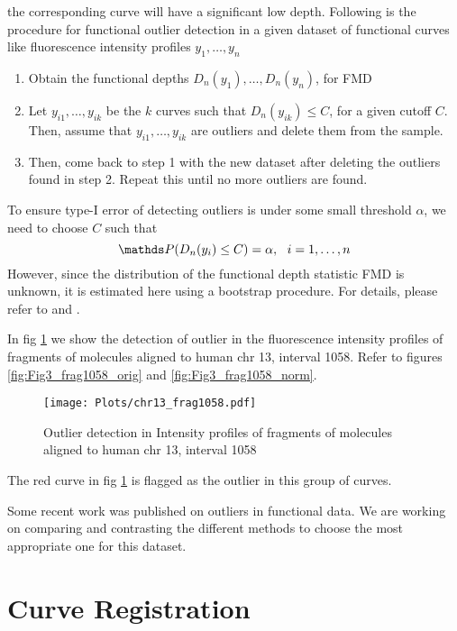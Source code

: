 the corresponding curve will have a significant low depth. Following is the procedure for functional outlier detection in a given dataset of functional curves like fluorescence intensity profiles
$y_1, \dots, y_n$
\begin{enumerate}
\item Obtain the functional depths $D_n(y_1), \dots, D_n(y_n)$, for FMD
\item Let $y_{i1}, \dots, y_{ik}$ be the $k$ curves such that $D_n(y_{ik}) \leq C$, for a given cutoff $C$. Then, assume that $y_{i1}, \dots, y_{ik}$ are outliers and delete them from the sample.
\item Then, come back to step 1 with the new dataset after deleting the outliers found in step 2. Repeat this until no more outliers are found.
\end{enumerate}
To ensure type-I error of detecting outliers is under some small threshold $\alpha$, we need to choose $C$ such that
\[ \Prob(D_n(y_i) \leq C) = \alpha,\ \ i = 1, \dots, n\]
However, since the distribution of the functional depth statistic FMD is unknown, it is estimated here using a bootstrap procedure. For details, please refer to \cite{Febrero-Bande_etal_2007_Environmetrics} and \cite{Febrero-Bande_delaFuente_2012_JSS}. 

In fig \ref{fig:Fig3_frag1058_outlier} we show the detection of outlier in the fluorescence intensity profiles of fragments of molecules aligned to human chr 13, interval 1058. Refer to figures \ref{fig:Fig3_frag1058_orig} and \ref{fig:Fig3_frag1058_norm}. 
\begin{figure}[H]
\begin{center}
\texttt{[image: Plots/chr13\_frag1058.pdf]}
\end{center}
\caption{Outlier detection in Intensity profiles of fragments of molecules aligned to human chr 13, interval 1058}
\label{fig:Fig3_frag1058_outlier}
\end{figure}
The red curve in fig \ref{fig:Fig3_frag1058_outlier} is flagged as the outlier in this group of curves.
\begin{tcolorbox}[colback=green!5,colframe=green!40!black,title=Work in progress] %
Some recent work was published on outliers in functional data. We are working on comparing and contrasting the different methods to choose the most appropriate one for this dataset.
\end{tcolorbox}

\section{Curve Registration} \label{Ch3_Regist}

